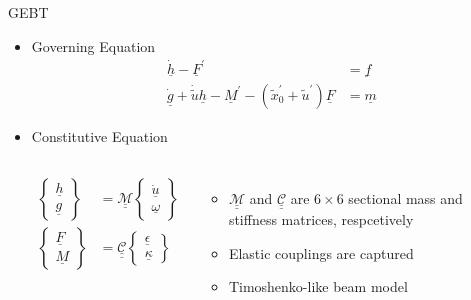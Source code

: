 \documentclass[xcolor=cmyk]{beamer}
\newcommand{\tens}[1]{\underline{\underline{#1}}}
\begin{document}
\begin{frame}{GEBT}
\begin{itemize}
    \item Governing Equation
      \begin{align*} 
      \dot{\underline{h}} - \underline{F}^\prime &= \underline{f} \\
      \dot{\underline{g}} + \dot{\widetilde{u}} \underline{h} -
      \underline{M}^\prime - (\widetilde{x}_0^\prime + \widetilde{u}^\prime) \underline{F}
      &= \underline{m} 
      \end{align*}
    
    \item Constitutive Equation
    \begin{columns}[c]
      \column{2.0 in}
      
      \begin{align*}
      \begin{Bmatrix} \underline{h} \\ \underline{g} \end{Bmatrix} &=
      \underline{\underline{\mathcal{M}}} \begin{Bmatrix} \dot{\underline{u}} \\
      \underline{\omega} \end{Bmatrix} \\
      \begin{Bmatrix} \underline{F} \\ \underline{M} \end{Bmatrix} &=
      \underline{\underline{\mathcal{C}}} \begin{Bmatrix} \underline{\epsilon} \\
      \underline{\kappa} \end{Bmatrix} 
      \end{align*}
      \column{2.0 in}
      \begin{itemize}
        \scriptsize
        \pause
        \item
        $\tens{\mathcal{M}}$ and $\tens{\mathcal{C}}$ are $6 \times 6$ sectional mass and stiffness matrices, respcetively \pause
        \item
        Elastic couplings are captured \pause
        \item
        Timoshenko-like beam model
      \end{itemize}
      
      \end{columns}


\end{itemize}
\end{frame}
\end{document}
